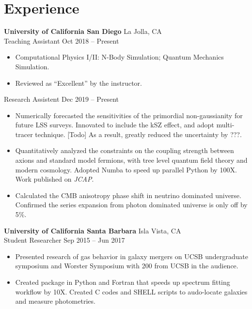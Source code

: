 \documentclass[letterpaper,12pt]{article}
\newenvironment{zitemize}{
\begin{itemize} \vspace{-.9em}\itemsep 0pt \parskip 0pt}
{\end{itemize}\vspace{-.5em}}
\newcommand{\todo}[1]{{\color{red} [Todo] #1}}
\newcommand{\proglang}[1]{#1}
\begin{document}
\section{Experience}
\textbf{University of California San Diego} \hfill La Jolla, CA \\
Teaching Assistant \hfill Oct 2018 -- Present \\
\begin{zitemize}
    \item Computational Physics I/II: N-Body Simulation; Quantum Mechanics Simulation. \\
    \item Reviewed as ``Excellent'' by the instructor.
\end{zitemize}
\vspace{-0.5em}
Research Assistent \hfill Dec 2019 -- Present \\
\begin{zitemize}
    \item Numerically forecasted the sensitivities of the primordial non-gaussianity for future LSS surveys. Innovated to include the kSZ effect, and adopt multi-tracer technique. \todo{As a result, greatly reduced the uncertainty by ???.}
    \item Quantitatively analyzed the constraints on the coupling strength between axions and standard model fermions, with tree level quantum field theory and modern cosmology. Adopted \proglang{Numba} to speed up parallel \proglang{Python} by 100X. Work published on \textit{JCAP}.
    \item Calculated the CMB anisotropy phase shift in neutrino dominated universe. Confirmed the series expansion from photon dominated universe is only off by 5\%.
\end{zitemize}

\textbf{University of California Santa Barbara} \hfill Isla Vista, CA \\
Student Researcher \hfill Sep 2015 -- Jun 2017 \\
\begin{zitemize}
    \item Presented research of gas behavior in galaxy mergers on UCSB undergraduate symposium and Worster Symposium with 200 from UCSB in the audience.
    \item Created package in \proglang{Python} and \proglang{Fortran} that speeds up spectrum fitting workflow by 10X. Created \proglang{C} codes and \proglang{SHELL} scripts to audo-locate galaxies and measure photometries.
\end{zitemize}
\end{document}
